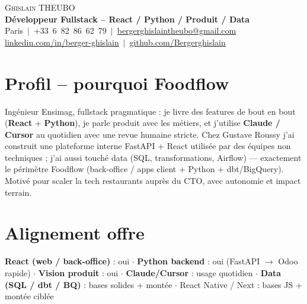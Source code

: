 \documentclass[a4paper,10.5pt]{article}
\begin{document}
\begin{center}
{\Huge \scshape Ghislain THEUBO}\\[3pt]
\textbf{D\'eveloppeur Fullstack -- React / Python / Produit / Data}\\[2pt]
\small Paris $\,|\,$ +33~6~82~86~62~79 $\,|\,$ \href{mailto:bergerghislaintheubo@gmail.com}{bergerghislaintheubo@gmail.com}\\[1pt]
\href{https://www.linkedin.com/in/berger-ghislain}{linkedin.com/in/berger-ghislain} $\,|\,$ \href{https://github.com/Bergerghislain}{github.com/Bergerghislain}
\end{center}

\section{Profil -- pourquoi Foodflow}
\small{
Ing\'enieur Ensimag, fullstack pragmatique : je livre des features de bout en bout
(\textbf{React} + \textbf{Python}), je parle produit avec les m\'etiers, et j'utilise
\textbf{Claude / Cursor} au quotidien avec une revue humaine stricte.
Chez Gustave Roussy j'ai construit une plateforme interne FastAPI + React utilis\'ee
par des \'equipes non techniques ; j'ai aussi touch\'e data (SQL, transformations, Airflow)
--- exactement le p\'erim\`etre Foodflow (back-office / apps client + Python + dbt/BigQuery).
Motiv\'e pour scaler la tech restaurants aupr\`es du CTO, avec autonomie et impact terrain.
}

\section{Alignement offre}
\small{
\textbf{React (web / back-office)} : oui $\cdot$
\textbf{Python backend} : oui (FastAPI $\rightarrow$ Odoo rapide) $\cdot$
\textbf{Vision produit} : oui $\cdot$
\textbf{Claude/Cursor} : usage quotidien $\cdot$
\textbf{Data (SQL / dbt / BQ)} : bases solides + mont\'ee $\cdot$
React Native / Next : bases JS + mont\'ee cibl\'ee
}
\end{document}
